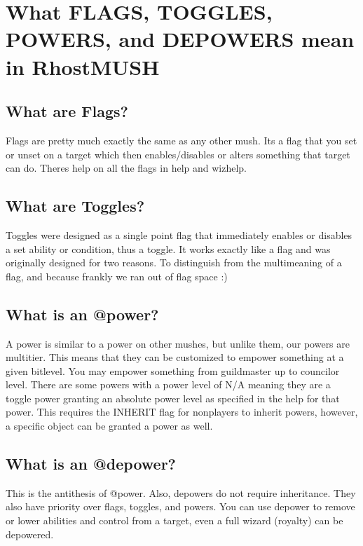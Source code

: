 \documentclass[letterpaper,10pt,english]{sphinxmanual}
\begin{document}
\chapter{What FLAGS, TOGGLES, POWERS, and DEPOWERS mean in RhostMUSH}
\label{\detokenize{toggles:what-flags-toggles-powers-and-depowers-mean-in-rhostmush}}\label{\detokenize{toggles::doc}}

\section{What are Flags?}
\label{\detokenize{toggles:what-are-flags}}
\sphinxAtStartPar
Flags are pretty much exactly the same as any other mush.  It\textquotesingle{}s a flag
that you set or unset on a target which then enables/disables or
alters something that target can do.  There\textquotesingle{}s help on all the flags
in help and wizhelp.


\section{What are Toggles?}
\label{\detokenize{toggles:what-are-toggles}}
\sphinxAtStartPar
Toggles were designed as a single point flag that immediately enables
or disables a set ability or condition, thus a \textquotesingle{}toggle\textquotesingle{}.  It works
exactly like a flag and was originally designed for two reasons.  To
distinguish from the multi\sphinxhyphen{}meaning of a \textquotesingle{}flag\textquotesingle{}, and because frankly
we ran out of flag space :)


\section{What is an @power?}
\label{\detokenize{toggles:what-is-an-power}}
\sphinxAtStartPar
A power is similar to a power on other mushes, but unlike them, our
powers are multi\sphinxhyphen{}tier.  This means that they can be customized to
empower something at a given bitlevel.  You may empower something
from guildmaster up to councilor level.  There are some powers
with a power level of N/A meaning they are a toggle power granting
an absolute power level as specified in the help for that power.
This requires the INHERIT flag for non\sphinxhyphen{}players to inherit powers,
however, a specific object can be granted a power as well.


\section{What is an @depower?}
\label{\detokenize{toggles:what-is-an-depower}}
\sphinxAtStartPar
This is the anti\sphinxhyphen{}thesis of @power.  Also, depowers do not require
inheritance.  They also have priority over flags, toggles, and
powers.  You can use depower to remove or lower abilities and
control from a target, even a full wizard (royalty) can be
depowered.
\end{document}
